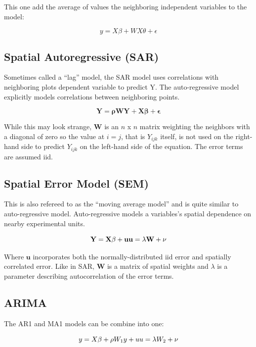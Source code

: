 \documentclass[]{book}
\begin{document}
This one add the average of values the neighboring independent variables to the model:

\[y = X\beta + WX\theta + \epsilon \]

\hypertarget{spatial-autoregressive-sar}{%
\subsection{Spatial Autoregressive (SAR)}\label{spatial-autoregressive-sar}}

Sometimes called a ``lag'' model, the SAR model uses correlations with neighboring plots dependent variable to predict Y. The auto-regressive model explicitly models correlations between neighboring points.

\[\mathbf{Y =  \rho W Y + X\beta + \epsilon} \]

While this may look strange, \(\mathbf{W}\) is an \(n\) x \(n\) matrix weighting the neighbors with a diagonal of zero so the value at \(i=j\), that is \(Y_{ijk}\) itself, is not used on the right-hand side to predict \(Y_{ijk}\) on the left-hand side of the equation. The error terms are assumed iid.

\hypertarget{spatial-error-model-sem}{%
\subsection{Spatial Error Model (SEM)}\label{spatial-error-model-sem}}

This is also refereed to as the ``moving average model'' and is quite similar to auto-regressive model. Auto-regressive models a variables's spatial dependence on nearby experimental units.

\[\mathbf {Y= X\beta + u} \\ \mathbf {u = \lambda W + \nu}\]

Where \(\mathbf{u}\) incorporates both the normally-distributed iid error and spatially correlated error. Like in SAR, \(\mathbf{W}\) is a matrix of spatial weights and \(\lambda\) is a parameter describing autocorrelation of the error terms.

\hypertarget{arima}{%
\subsection{ARIMA}\label{arima}}

The AR1 and MA1 models can be combine into one:

\[ y = X\beta + \rho W_1y+u \\ u = \lambda W_2 + \nu \]
\end{document}
